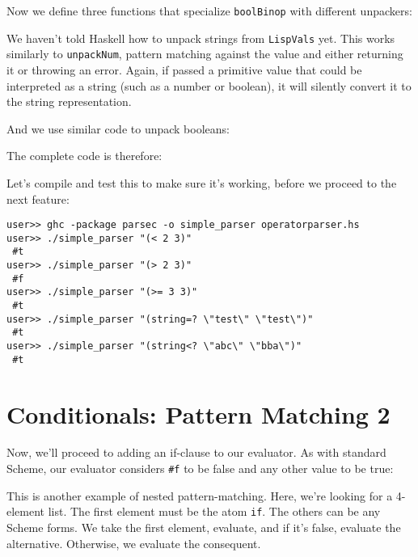Now we define three functions that specialize \verb|boolBinop| with different unpackers:
 
 
We haven't told Haskell how to unpack strings from \verb|LispVals| yet. This works similarly to \verb|unpackNum|, pattern matching against the value and either returning it or throwing an error. Again, if passed a primitive value that could be interpreted as a string (such as a number or boolean), it will silently convert it to the string representation.
 
 
And we use similar code to unpack booleans:
 
 
The complete code is therefore:
 
 
Let's compile and test this to make sure it's working, before we proceed to the next feature:
 
\begin{lstlisting}[language=shell,numbers=none,nolol]
user>> ghc -package parsec -o simple_parser operatorparser.hs
user>> ./simple_parser "(< 2 3)"
 #t
user>> ./simple_parser "(> 2 3)"
 #f
user>> ./simple_parser "(>= 3 3)"
 #t
user>> ./simple_parser "(string=? \"test\" \"test\")"
 #t
user>> ./simple_parser "(string<? \"abc\" \"bba\")"
 #t
\end{lstlisting}
 
\section{Conditionals: Pattern Matching 2}
 
Now, we'll proceed to adding an if-clause to our evaluator. As with standard Scheme, our evaluator considers \verb|#f| to be false and any other value to be true:
 
 
This is another example of nested pattern-matching. Here, we're looking for a 4-element list. The first element must be the atom \verb|if|. The others can be any Scheme forms. We take the first element, evaluate, and if it's false, evaluate the alternative. Otherwise, we evaluate the consequent.
 

